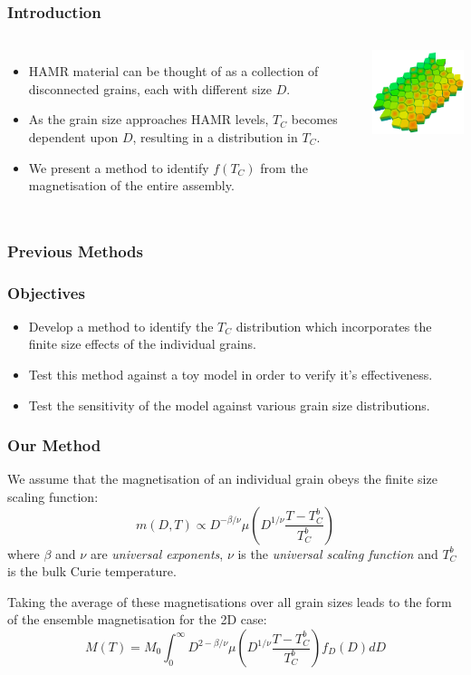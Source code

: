 \documentclass{beamer}
\begin{document}
\begin{frame}
	\frametitle{Introduction}
	\begin{columns}
		\column{7cm}
		\begin{itemize}
			\item{HAMR material can be thought of as a collection of disconnected grains, each with different size $D$.\newline}
			\item{As the grain size approaches HAMR levels, $T_C$ becomes dependent upon $D$, resulting in a distribution in $T_C$.\newline}
			\item{We present a method to identify $f(T_C)$ from the magnetisation of the entire assembly.}
		\end{itemize}
		\column{5cm}
		\includegraphics[width=5cm]{Images/grains}
	\end{columns}
\end{frame}

\begin{frame}
	\frametitle{Previous Methods}
\end{frame}

\begin{frame}
	\frametitle{Objectives}
	\begin{itemize}
		\item{Develop a method to identify the $T_C$ distribution which incorporates the finite size effects of the individual grains.\newline}
		\item{Test this method against a toy model in order to verify it's effectiveness.\newline}
		\item{Test the sensitivity of the model against various grain size distributions.\newline}
	\end{itemize}
\end{frame}

\begin{frame}
	\frametitle{Our Method}
	We assume that the magnetisation of an individual grain obeys the finite size scaling function:
	$$
	m(D,T) \propto D^{-\beta/\nu} \mu \left(D^{1/\nu}\frac{T-T_C^b}{T_C^b}\right)
	$$
	where $\beta$ and $\nu$ are \textit{universal exponents}, $\nu$ is the \textit{universal scaling function} and $T_C^b$ is the bulk Curie temperature.
	
	Taking the average of these magnetisations over all grain sizes leads to the form of the ensemble magnetisation for the 2D case:
	$$
	M(T) = M_0\int_0^\infty D^{2 - \beta/\nu} \mu \left(D^{1/\nu}\frac{T-T_C^b}{T_C^b}\right) f_D(D) dD
	$$
\end{frame}
\end{document}
